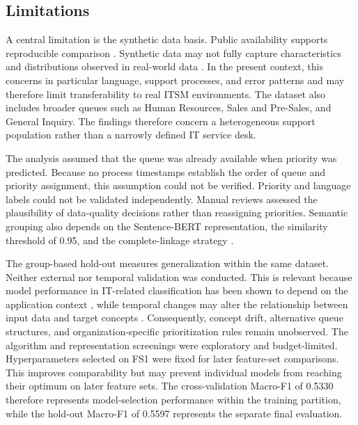 \subsection{Limitations}

A central limitation is the synthetic data basis. Public availability supports
reproducible comparison \cite{bueck2025support}. Synthetic data may not fully
capture characteristics and distributions observed in real-world data
\cite{goyal2024synthetic}. In the present context, this concerns in particular
language, support processes, and error patterns and may therefore limit
transferability to real ITSM environments. The dataset also includes broader queues such as
Human Resources, Sales and Pre-Sales, and General Inquiry. The findings
therefore concern a heterogeneous support population rather than a narrowly
defined IT service desk.

The analysis assumed that the queue was already available when priority was
predicted. Because no process timestamps establish the order of queue and
priority assignment, this assumption could not be verified. Priority and
language labels could not be validated independently. Manual reviews assessed
the plausibility of data-quality decisions rather than reassigning priorities.
Semantic grouping also depends on the Sentence-BERT representation, the
similarity threshold of 0.95, and the complete-linkage strategy
\cite{reimers2019sentencebert}.

The group-based hold-out measures generalization within the same dataset.
Neither external nor temporal validation was conducted. This is relevant because
model performance in IT-related classification has been shown to depend on the
application context \cite{ahmed2023incident}, while temporal changes may alter
the relationship between input data and target concepts \cite{gama2014conceptdrift}.
Consequently, concept drift, alternative queue structures, and
organization-specific prioritization rules remain unobserved. The algorithm and representation screenings were exploratory and budget-limited. Hyperparameters selected on FS1 were fixed for later feature-set comparisons. This improves comparability but may prevent individual
models from reaching their optimum on later feature sets. The cross-validation
Macro-F1 of 0.5330 therefore represents model-selection performance within the
training partition, while the hold-out Macro-F1 of 0.5597 represents the
separate final evaluation.

